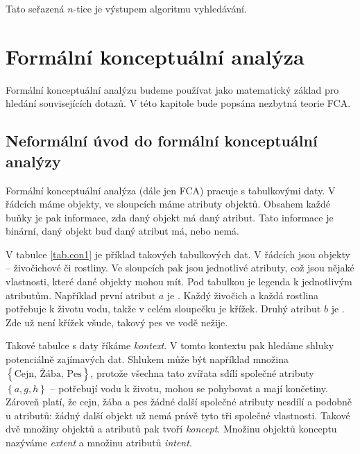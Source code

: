 \documentclass[12pt]{article}
\newcommand{\ssection}[1]{\subsection{#1}}
\newcommand{\adds}[1]{\left\{#1\right\}}
\newcommand{\strong}[1]{{\em #1}}
\begin{document}
Tato seřazená $n$-tice je výstupem algoritmu vyhledávání. 






\newpage
\section{Formální konceptuální analýza}
Formální konceptuální analýzu budeme používat jako matematický základ pro hledání souvisejících dotazů. V této kapitole bude popsána nezbytná teorie FCA. 

\ssection{Neformální úvod do formální konceptuální analýzy}
Formální konceptuální analýza (dále jen FCA) pracuje s tabulkovými daty. V řádcích máme objekty, ve sloupcích máme atributy objektů. Obsahem každé buňky je pak informace, zda daný objekt má daný atribut. Tato informace je binární, daný objekt buď daný atribut má, nebo nemá. 

V tabulce \ref{tab.con1} je příklad takových tabulkových dat. V řádcích jsou objekty -- živočichové či rostliny. Ve sloupcích pak jsou jednotlivé atributy, což jsou nějaké vlastnosti, které dané objekty mohou mít. Pod tabulkou je legenda k jednotlivým atributům. Například první atribut $a$ je . Každý živočich a každá rostlina potřebuje k životu vodu, takže v celém sloupečku je křížek. Druhý atribut $b$ je . Zde už není křížek všude, takový pes ve vodě nežije. 


Takové tabulce s daty říkáme \strong{kontext}. V tomto kontextu pak hledáme shluky potenciálně zajímavých dat. Shlukem může být například množina $\adds{\mbox{Cejn, Žába, Pes}}$, protože všechna tato zvířata sdílí společné atributy $\adds{a, g, h}$ -- potřebují vodu k životu, mohou se pohybovat a mají končetiny. Zároveň platí, že cejn, žába a pes žádné další společné atributy nesdílí a podobně u atributů: žádný další objekt už nemá právě tyto tři společné vlastnosti. Takové dvě množiny objektů a atributů pak tvoří \strong{koncept}. Množinu objektů konceptu nazýváme \strong{extent} a množinu atributů \strong{intent}. 
\end{document}
